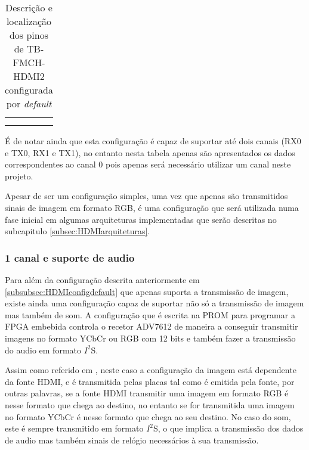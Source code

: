 \begin{table}[h!]
\begin{tabular}{|c|c|c|c|}
		&                                                                                       &                                                                                       &                                                                         \\
		&                                                                                       &                                                                                       &                                                                         \\ \hline
	\end{tabular}
	\caption{Descrição e localização dos pinos de TB-FMCH-HDMI2 configurada por \textit{default}}
	\label{table:HDMIdefaultSimplified}
\end{table}

É de notar ainda que esta configuração é capaz de suportar até dois canais (RX0 e TX0, RX1 e TX1), no entanto nesta tabela apenas são apresentados os dados correspondentes ao canal 0 pois apenas será necessário utilizar um canal neste projeto. 

Apesar de ser um configuração simples, uma vez que apenas são transmitidos sinais de imagem em formato RGB, é uma configuração que será utilizada numa fase inicial em algumas arquiteturas implementadas que serão descritas no subcapitulo \ref{subsec:HDMIarquiteturas}.

\subsubsection{1 canal e suporte de audio} \label {subsubsec:HDMIconfig+audio}

Para além da configuração descrita anteriormente em \ref{subsubsec:HDMIconfigdefault} que apenas suporta a transmissão de imagem, existe ainda uma configuração capaz de suportar não só a transmissão de imagem mas também de som. A configuração que é escrita na PROM para programar a FPGA embebida controla o recetor ADV7612 de maneira a conseguir transmitir imagens no formato YCbCr ou RGB com 12 bits e também fazer a transmissão do audio em formato $I^{2}$S.

Assim como referido em \cite{R014}, neste caso a configuração da imagem está dependente da fonte HDMI, e é transmitida pelas placas tal como é emitida pela fonte, por outras palavras, se a fonte HDMI transmitir uma imagem em formato RGB é nesse formato que chega ao destino, no entanto se for transmitida uma imagem no formato YCbCr é nesse formato que chega ao seu destino. No caso do som, este é sempre transmitido em formato $I^{2}$S, o que implica a transmissão dos dados de audio mas também sinais de relógio necessários à sua transmissão.

